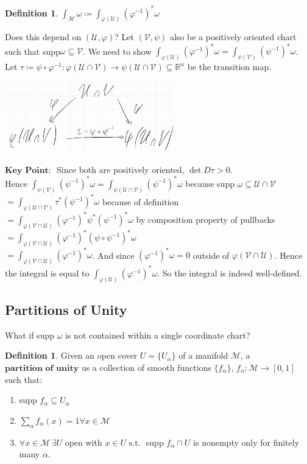 \documentclass[10pt]{article}
\theoremstyle{plain}
\theoremstyle{definition}
\newtheorem{defn}[thm]{Definition} %
\newcommand{\st}{\text{ s.t. }}
\newcommand{\KeyPoint}{\textbf{Key Point: }}
\newcommand{\Real}{\mathbb{R}}
\newcommand{\man}{\mathcal{M}}
\newcommand{\chartU}{\mathcal{U}}
\newcommand{\chartV}{\mathcal{V}}
\newcommand{\chart}{\varphi}
\newcommand{\xman}{x\in\man}
\newcommand{\sumfromto}[2]{\sum\limits_{#1}^{#2}}
\newcommand{\mysubsection}[1]{
    \subsection{#1}
}
\begin{document}
\begin{defn}
$\int_\man \omega \coloneqq \int_{\chart(\chartU)} (\chart^{-1})^*\omega$
\end{defn}
Does this depend on $(\chartU,\chart)$? Let $(\chartV,\psi)$ also be a positively oriented chart such that supp$\omega \subseteq \chartV$. We need to show $ \int_{\chart(\chartU)} (\chart^{-1})^*\omega =  \int_{\psi(\chartV)} (\psi^{-1})^*\omega$. Let $\tau \coloneqq \psi \circ \varphi ^{-1} : \chart(\chartU\cap \chartV) \to \psi(\chartU\cap\chartV) \subseteq \Real^n$ be the transition map.
\begin{center}\includegraphics[width=0.55\textwidth]{Images/integrationofcharts.png}\end{center}
$\KeyPoint$ Since both are positively oriented, $\det D\tau > 0$.\\
Hence $\int_{\psi(\chartV)} (\psi^{-1})^*\omega = \int_{\psi(\chartU \cap\chartV)} (\psi^{-1})^*\omega$ because supp $\omega \subseteq\chartU\cap\chartV$\\
$ = \int_{\chart(\chartU \cap\chartV)} \tau^*(\psi^{-1})^*\omega$ because of definition\\
$= \int_{\chart(\chartV\cap\chartU)} (\chart^{-1})^*\psi^*(\psi^{-1})^*\omega$ by composition property of pullbacks\\
$= \int_{\chart(\chartV \cap\chartU)} (\chart^{-1})^*(\psi\circ\psi^{-1})^*\omega$\\
$=\int_{\chart(\chartV \cap\chartU)} (\chart^{-1})^*\omega$. And since $(\chart^{-1})^*\omega =0 $ outside of $\chart(\chartV\cap\chartU)$. Hence the integral is equal to $\int_{\chart(\chartU)}(\chart^{-1})^*\omega.$ So the integral is indeed well-defined.
 \mysubsection{Partitions of Unity}
 What if supp $\omega$ is not contained within a single coordinate chart? 
 \begin{defn}
 Given an open cover $U = \{U_\alpha\}$ of a manifold $\man$, a $\textbf{partition of unity}$ us a collection of smooth functions $\{f_\alpha\}$, $f_\alpha : \man \to [0,1]$ such that:
 \begin{enumerate}
     \item supp $f_\alpha \subseteq U_\alpha$
     \item $\sumfromto{\alpha}{}f_\alpha(x) = 1 \forall \xman$
     \item $\forall\xman\, \exists U$ open with $x\in U \st $ supp $f_\alpha \cap U$ is nonempty only for finitely many $\alpha$.
 \end{enumerate}
 \end{defn}
\end{document}
